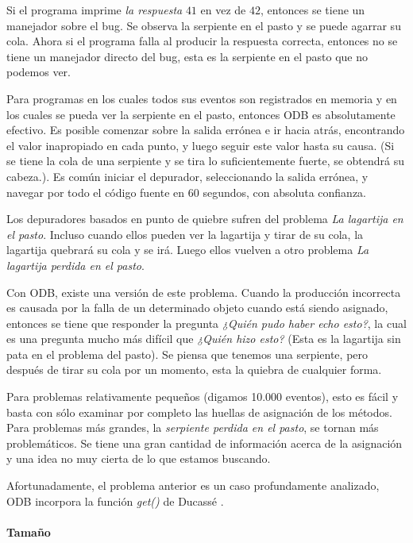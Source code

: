 \documentclass[12pt,legalpaper]{report}
\begin{document}
Si el programa imprime \textit{la respuesta } $41$ en vez de $42$, entonces se tiene un manejador sobre el bug.  Se observa la serpiente en el pasto y se puede agarrar su cola.  Ahora si el programa falla al producir la respuesta correcta, entonces no se tiene un manejador directo del bug, esta es la serpiente en el pasto que no podemos ver.

Para programas en los cuales todos sus eventos son registrados en memoria y en los cuales se pueda ver la serpiente en el pasto, entonces ODB es absolutamente efectivo.  Es posible comenzar sobre la salida errónea e ir hacia atrás, encontrando el valor inapropiado en cada punto, y luego seguir este valor hasta su causa. (Si se tiene la cola de una serpiente y se tira lo suficientemente fuerte, se obtendrá su cabeza.). Es común iniciar el depurador, seleccionando la salida errónea, y navegar por todo el código fuente en $60$ segundos, con absoluta confianza.

Los depuradores basados en punto de quiebre sufren del problema \textit{La lagartija en el pasto}.  Incluso cuando ellos pueden ver la lagartija y tirar de su cola, la lagartija quebrará su cola y se irá.  Luego ellos vuelven a otro problema \textit{La lagartija perdida en el pasto}.

Con ODB, existe una versión de este problema.  Cuando la producción incorrecta es causada por la falla de un determinado objeto cuando está siendo asignado, entonces se tiene que responder la pregunta \textit{¿Quién pudo haber echo esto?}, la cual es una pregunta mucho más difícil que \textit{¿Quién hizo esto?} (Esta es la lagartija sin pata en el problema del pasto).  Se piensa que tenemos una serpiente, pero después de tirar su cola por un momento, esta la quiebra de cualquier forma.

Para problemas relativamente pequeños (digamos 10.000 eventos), esto es fácil y basta con sólo examinar por completo las huellas de asignación de los métodos.  Para problemas más grandes, la \textit{serpiente perdida en el pasto}, se tornan más problemáticos.  Se tiene una gran cantidad de información acerca de la asignación y una idea no muy cierta de lo que estamos buscando.

Afortunadamente, el problema anterior es un caso profundamente analizado, ODB incorpora la función \textit{get()} de Ducassé \cite{ducasse}.

				\paragraph{Tamaño}
\end{document}
